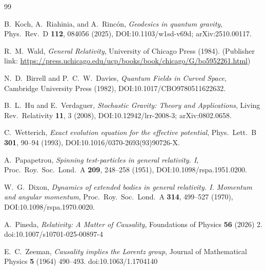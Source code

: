 \documentclass[11pt,a4paper]{article}
\theoremstyle{thmstyleone}
\theoremstyle{thmstyletwo}
\theoremstyle{thmstylethree}
\begin{document}
            \begin{thebibliography}{99}

                B.~Koch, A.~Riahinia, and A.~Rinc\'on,
                \emph{Geodesics in quantum gravity},
                Phys.\ Rev.\ D \textbf{112}, 084056 (2025),
                DOI:10.1103/w1sd-v69d; arXiv:2510.00117.

                R.~M.~Wald,
                \emph{General Relativity},
                University of Chicago Press (1984).
                (Publisher link: \url{https://press.uchicago.edu/ucp/books/book/chicago/G/bo5952261.html})

                N.~D.~Birrell and P.~C.~W.~Davies,
                \emph{Quantum Fields in Curved Space},
                Cambridge University Press (1982),
                DOI:10.1017/CBO9780511622632.

                B.~L.~Hu and E.~Verdaguer,
                \emph{Stochastic Gravity: Theory and Applications},
                Living Rev.\ Relativity \textbf{11}, 3 (2008),
                DOI:10.12942/lrr-2008-3; arXiv:0802.0658.

                C.~Wetterich,
                \emph{Exact evolution equation for the effective potential},
                Phys.\ Lett.\ B \textbf{301}, 90--94 (1993),
                DOI:10.1016/0370-2693(93)90726-X.

                A.~Papapetrou,
                \emph{Spinning test-particles in general relativity. I},
                Proc.\ Roy.\ Soc.\ Lond.\ A \textbf{209}, 248--258 (1951),
                DOI:10.1098/rspa.1951.0200.

                W.~G.~Dixon,
                \emph{Dynamics of extended bodies in general relativity. I. Momentum and angular momentum},
                Proc.\ Roy.\ Soc.\ Lond.\ A \textbf{314}, 499--527 (1970),
                DOI:10.1098/rspa.1970.0020.


        A.~Pineda,
        \textit{Relativity: A Matter of Causality},
        Foundations of Physics \textbf{56} (2026) 2.
        doi:10.1007/s10701-025-00897-4

        E.~C.~Zeeman,
        \textit{Causality implies the Lorentz group},
        Journal of Mathematical Physics \textbf{5} (1964) 490--493.
        doi:10.1063/1.1704140


\end{thebibliography}
\end{document}
